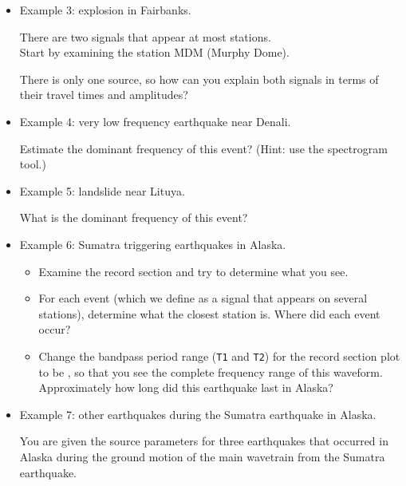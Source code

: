 \documentclass[11pt,titlepage,fleqn]{article}
\begin{document}
\begin{enumerate}
\begin{itemize}
\item Example 3: explosion in Fairbanks. 

There are two signals that appear at most stations. \\
Start by examining the station MDM (Murphy Dome).

There is only one source, so how can you explain both signals in terms of their travel times and amplitudes?

\item Example 4: very low frequency earthquake near Denali. 

Estimate the dominant frequency of this event? (Hint: use the spectrogram tool.)

\item Example 5: landslide near Lituya. 

What is the dominant frequency of this event?

\item Example 6: Sumatra  triggering earthquakes in Alaska. 
%
\begin{itemize}
\item Examine the record section and try to determine what you see.
\item For each event (which we define as a signal that appears on several stations), determine what the closest station is. Where did each event occur?
\item Change the bandpass period range (\verb+T1+ and \verb+T2+) for the record section plot to be , so that you see the complete frequency range of this waveform. \\
Approximately how long did this earthquake last in Alaska?
\end{itemize}

\item Example 7: other earthquakes during the Sumatra  earthquake in Alaska.

You are given the source parameters for three earthquakes that occurred in Alaska during the ground motion of the main wavetrain from the Sumatra  earthquake.


\end{itemize}
\end{enumerate}
\end{document}
